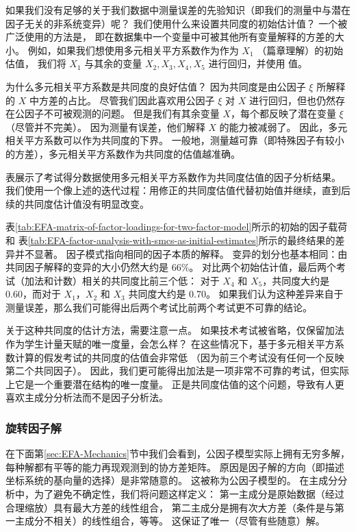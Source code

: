 如果我们没有足够的关于我们数据中测量误差的先验知识（即我们的测量中与潜在因子无关的非系统变异）呢？
我们使用什么来设置共同度的初始估计值？
一个被广泛使用的方法是，
即在数据集中一个变量中可被其他所有变量解释的方差的大小。
例如，如果我们想使用多元相关平方系数作为作为 $ X_1 $ （篇章理解）的初始估值，
我们将 $ X_1 $ 与其余的变量 $ X_2, X_3, X_4, X_5 $ 进行回归，并使用 \rsquare 值。

为什么多元相关平方系数是共同度的良好估值？
因为共同度是由公因子 $ \xi $ 所解释的 $ X $ 中方差的占比。
尽管我们因此喜欢用公因子 $ \xi $ 对 $ X $ 进行回归，但也仍然存在公因子不可被观测的问题。
但是我们有其余变量 $ X $，每个都反映了潜在变量 $ \xi $（尽管并不完美）。
因为测量有误差，他们解释 $ X $ 的能力被减弱了。
因此，多元相关平方系数可以作为共同度的下界。
一般地，测量越可靠（即特殊因子有较小的方差），多元相关平方系数作为共同度的估值越准确。

表展示了考试得分数据使用多元相关平方系数作为共同度估值的因子分析结果。
我们使用一个像上述的迭代过程：用修正的共同度估值代替初始值并继续，直到后续的共同度估计值没有明显改变。

表\ref{tab:EFA-matrix-of-factor-loadings-for-two-factor-model}所示的初始的因子载荷和
表\ref{tab:EFA-factor-analysis-with-smcs-as-initial-estimates}所示的最终结果的差异并不显著。
因子模式指向相同的因子本质的解释。
变异的划分也基本相同：由共同因子解释的变异的大小仍然大约是 66\%。
对比两个初始估计值，最后两个考试（加法和计数）相关的共同度比前三个低：
对于 $ X_4 $ 和 $ X_5 $，共同度大约是 0.60，而对于 $ X_1 $，$ X_2 $ 和 $ X_3 $ 共同度大约是 0.70。
如果我们认为这种差异来自于测量误差，那么我们可能得出后两个考试比前两个考试更不可靠的结论。

关于这种共同度的估计方法，需要注意一点。
如果技术考试被省略，仅保留加法作为学生计量天赋的唯一度量，会怎么样？
在这些情况下，基于多元相关平方系数计算的假发考试的共同度的估值会非常低
（因为前三个考试没有任何一个反映第二个共同因子）。
因此，我们更可能得出加法是一项非常不可靠的考试，但实际上它是一个重要潜在结构的唯一度量。
正是共同度估值的这个问题，导致有人更喜欢主成分分析法而不是因子分析法。

\subsubsection{旋转因子解}

在下面第\ref{sec:EFA-Mechanics}节中我们会看到，公因子模型实际上拥有无穷多解，
每种解都有平等的能力再现观测到的协方差矩阵。
原因是因子解的方向（即描述坐标系统的基向量的选择）是非常随意的。
这被称为公因子模型的。
在主成分分析中，为了避免不确定性，我们将问题这样定义：
第一主成分是原始数据（经过合理缩放）具有最大方差的线性组合，
第二主成分是拥有次大方差（条件是与第一主成分不相关）的线性组合，等等。
这保证了唯一（尽管有些随意）解。


